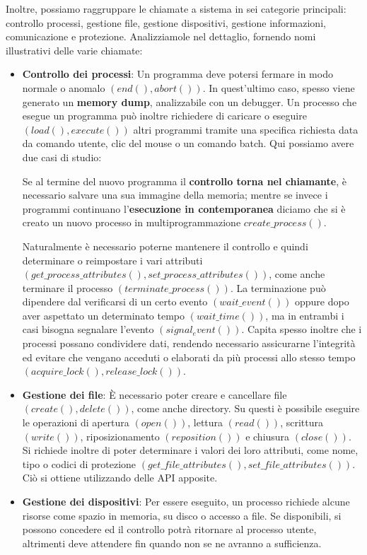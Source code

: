 \noindent Inoltre, possiamo raggruppare le chiamate a sistema in sei categorie principali: controllo processi, gestione file, gestione dispositivi, gestione informazioni, comunicazione e protezione. Analizziamole nel dettaglio, fornendo nomi illustrativi delle varie chiamate: \begin{itemize}
	\item \textbf{Controllo dei processi}: Un programma deve potersi fermare in modo normale o anomalo $(end(), abort())$. In quest'ultimo caso, spesso viene generato un \textbf{memory dump}, analizzabile con un debugger. Un processo che esegue un programma può inoltre richiedere di caricare o eseguire $(load(), execute())$ altri programmi tramite una specifica richiesta data da comando utente, clic del mouse o un comando batch. Qui possiamo avere due casi di studio:\par
	Se al termine del nuovo programma il \textbf{controllo torna nel chiamante}, è necessario salvare una sua immagine della memoria; mentre se invece i programmi continuano l'\textbf{esecuzione in contemporanea} diciamo che si è creato un nuovo processo in multiprogrammazione $create\_process()$.\par
	Naturalmente è necessario poterne mantenere il controllo e quindi determinare o reimpostare i vari attributi $(get\_process\_attributes(), set\_process\_attributes())$, come anche terminare il processo $(terminate\_process())$. La terminazione può dipendere dal verificarsi di un certo evento $(wait\_event())$ oppure dopo aver aspettato un determinato tempo $(wait\_time())$, ma in entrambi i casi bisogna segnalare l'evento $(signal_event())$. Capita spesso inoltre che i processi possano condividere dati, rendendo necessario assicurarne l'integrità ed evitare che vengano acceduti o elaborati da più processi allo stesso tempo $(acquire\_lock(), release\_lock())$.
	\item \textbf{Gestione dei file}: È necessario poter creare e cancellare file $(create(), delete())$, come anche directory. Su questi è possibile eseguire le operazioni di apertura $(open())$, lettura $(read())$, scrittura $(write())$, riposizionamento $(reposition())$ e chiusura $(close())$. Si richiede inoltre di poter determinare i valori dei loro attributi, come nome, tipo o codici di protezione $(get\_file\_attributes(), set\_file\_attributes())$. Ciò si ottiene utilizzando delle API apposite.
	\item \textbf{Gestione dei dispositivi}: Per essere eseguito, un processo richiede alcune risorse come spazio in memoria, su disco o accesso a file. Se disponibili, si possono concedere ed il controllo potrà ritornare al processo utente, altrimenti deve attendere fin quando non se ne avranno a sufficienza.\par

\end{itemize}
